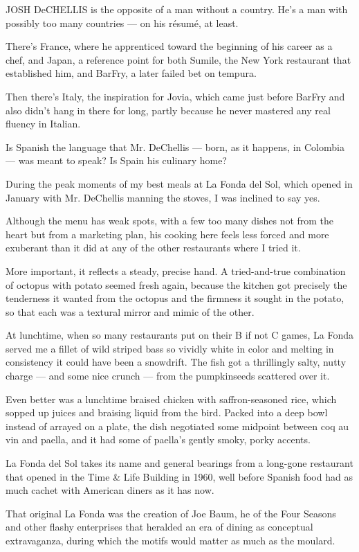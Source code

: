 JOSH DeCHELLIS is the opposite of a man without a country. He's a man
with possibly too many countries --- on his résumé, at least.

There's France, where he apprenticed toward the beginning of his career
as a chef, and Japan, a reference point for both Sumile, the New York
restaurant that established him, and BarFry, a later failed bet on
tempura.

Then there's Italy, the inspiration for Jovia, which came just before
BarFry and also didn't hang in there for long, partly because he never
mastered any real fluency in Italian.

Is Spanish the language that Mr. DeChellis --- born, as it happens, in
Colombia --- was meant to speak? Is Spain his culinary home?

During the peak moments of my best meals at La Fonda del Sol, which
opened in January with Mr. DeChellis manning the stoves, I was inclined
to say yes.

Although the menu has weak spots, with a few too many dishes not from
the heart but from a marketing plan, his cooking here feels less forced
and more exuberant than it did at any of the other restaurants where I
tried it.

More important, it reflects a steady, precise hand. A tried-and-true
combination of octopus with potato seemed fresh again, because the
kitchen got precisely the tenderness it wanted from the octopus and the
firmness it sought in the potato, so that each was a textural mirror and
mimic of the other.

At lunchtime, when so many restaurants put on their B if not C games, La
Fonda served me a fillet of wild striped bass so vividly white in color
and melting in consistency it could have been a snowdrift. The fish got
a thrillingly salty, nutty charge --- and some nice crunch --- from the
pumpkinseeds scattered over it.

Even better was a lunchtime braised chicken with saffron-seasoned rice,
which sopped up juices and braising liquid from the bird. Packed into a
deep bowl instead of arrayed on a plate, the dish negotiated some
midpoint between coq au vin and paella, and it had some of paella's
gently smoky, porky accents.

La Fonda del Sol takes its name and general bearings from a long-gone
restaurant that opened in the Time \& Life Building in 1960, well before
Spanish food had as much cachet with American diners as it has now.

That original La Fonda was the creation of Joe Baum, he of the Four
Seasons and other flashy enterprises that heralded an era of dining as
conceptual extravaganza, during which the motifs would matter as much as
the moulard.


